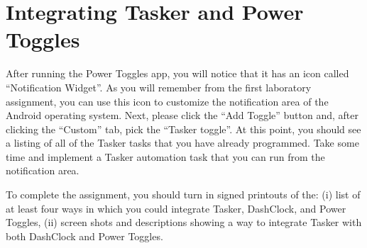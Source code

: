 \section*{Integrating Tasker and Power Toggles}

After running the Power Toggles app, you will notice that it has an icon called ``Notification Widget''.  As you will
remember from the first laboratory assignment, you can use this icon to customize the notification area of the Android
operating system.  Next, please click the ``Add Toggle'' button and, after clicking the ``Custom'' tab, pick the
``Tasker toggle''.  At this point, you should see a listing of all of the Tasker tasks that you have already programmed.
Take some time and implement a Tasker automation task that you can run from the notification area.


To complete the assignment, you should turn in signed printouts of the: (i) list of at least four ways in which you
could integrate Tasker, DashClock, and Power Toggles, (ii) screen shots and descriptions showing a way to integrate
Tasker with both DashClock and Power Toggles.



